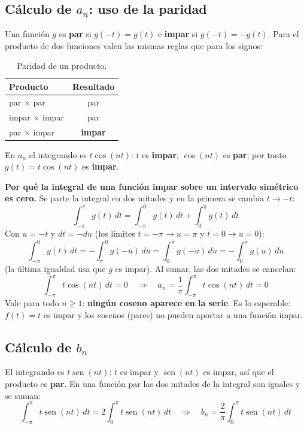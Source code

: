 \documentclass[11pt,a4paper]{article}
\DeclareMathOperator{\sen}{sen}
\begin{document}
\subsection{Cálculo de \texorpdfstring{$a_n$}{an}: uso de la paridad}
Una función $g$ es \textbf{par} si $g(-t)=g(t)$ e \textbf{impar} si $g(-t)=-g(t)$. Para
el producto de dos funciones valen las mismas reglas que para los signos:

\begin{table}[H]
\centering
\caption{Paridad de un producto.}
\begin{tabular}{lc}
\toprule
\textbf{Producto} & \textbf{Resultado}\\
\midrule
par $\times$ par & par\\
impar $\times$ impar & par\\
par $\times$ impar & \textbf{impar}\\
\bottomrule
\end{tabular}
\end{table}

En $a_n$ el integrando es $t\cos(nt)$: $t$ es \textbf{impar}, $\cos(nt)$ es \textbf{par};
por tanto $g(t)=t\cos(nt)$ es \textbf{impar}.

\textbf{Por qué la integral de una función impar sobre un intervalo simétrico es cero.}
Se parte la integral en dos mitades y en la primera se cambia $t\to -t$:
\begin{equation*}
  \int_{-\pi}^{\pi}g(t)\,dt=\int_{-\pi}^{0}g(t)\,dt+\int_{0}^{\pi}g(t)\,dt
\end{equation*}
Con $u=-t$ y $dt=-du$ (los límites $t=-\pi\to u=\pi$ y $t=0\to u=0$):
\begin{equation*}
  \int_{-\pi}^{0}g(t)\,dt=-\int_{\pi}^{0}g(-u)\,du=\int_{0}^{\pi}g(-u)\,du=-\int_{0}^{\pi}g(u)\,du
\end{equation*}
(la última igualdad usa que $g$ es impar). Al sumar, las dos mitades se cancelan:
\begin{equation*}
  \int_{-\pi}^{\pi}t\cos(nt)\,dt=0\quad\Longrightarrow\quad
  \boxed{a_n=\frac{1}{\pi}\int_{-\pi}^{\pi}t\cos(nt)\,dt=0}
\end{equation*}
Vale para todo $n\ge 1$: \textbf{ningún coseno aparece en la serie}. Es lo esperable:
$f(t)=t$ es impar y los cosenos (pares) no pueden aportar a una función impar.

\subsection{Cálculo de \texorpdfstring{$b_n$}{bn}}
El integrando es $t\sen(nt)$: $t$ es impar y $\sen(nt)$ es impar, así que el producto
es \textbf{par}. En una función par las dos mitades de la integral son iguales y se suman:
\begin{equation*}
  \int_{-\pi}^{\pi}t\sen(nt)\,dt=2\int_{0}^{\pi}t\sen(nt)\,dt
  \quad\Longrightarrow\quad
  \boxed{b_n=\frac{2}{\pi}\int_{0}^{\pi}t\sen(nt)\,dt}
\end{equation*}
\end{document}
